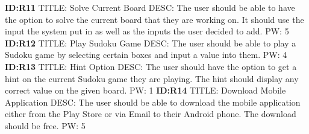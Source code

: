 \documentclass{article}
\begin{document}
\textbf{ID:R11} \newline TITLE: Solve Current Board \newline DESC: The user should be able to have the option to solve the current board that they are working on. It should use the input the system put in as well as the inputs the user decided to add. \newline PW: 5 \newline \newline
\textbf{ID:R12} \newline TITLE: Play Sudoku Game \newline DESC: The user should be able to play a Sudoku game by selecting certain boxes and input a value into them. \newline PW: 4 \newline \newline
\textbf{ID:R13} \newline TITLE: Hint Option \newline DESC: The user should have the option to get a hint on the current Sudoku game they are playing. The hint should display any correct value on the given board. \newline PW: 1 \newline \newline
\textbf{ID:R14} \newline TITLE: Download Mobile Application \newline DESC: The user should be able to download the mobile application either from the Play Store or via Email to their Android phone. The download should be free. \newline PW: 5 \newline 
\end{document}
